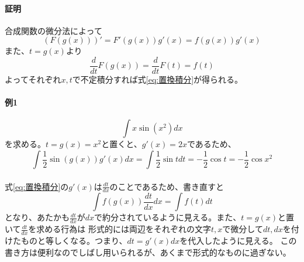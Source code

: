 \documentclass[a4j,dvipdfmx]{jsarticle}
\begin{document}
                \paragraph{証明} 合成関数の微分法によって
                \begin{equation}
                    (F(g(x)))'=F'(g(x))g'(x)=f(g(x))g'(x) 
                \end{equation}
                また、$t=g(x)$より
                \begin{equation}
                    \frac{d}{dt}F(g(x))=\frac{d}{dt}F(t)=f(t)
                \end{equation}
                よってそれぞれ$x,t$で不定積分すれば式\ref{eq:置換積分}が得られる。\\

                \paragraph{例1}
                \begin{equation*}
                    \int x\sin(x^2)dx
                \end{equation*}
                を求める。$t=g(x)=x^2$と置くと、$g'(x)=2x$であるため、
                \begin{equation*}
                    \int \frac{1}{2}\sin(g(x))g'(x)dx=\int \frac{1}{2}\sin t dt = -\frac{1}{2}\cos t = -\frac{1}{2}\cos x^2
                \end{equation*}\\

                式\ref{eq:置換積分}の$g'(x)$は$\frac{dt}{dx}$のことであるため、書き直すと
                \begin{equation}
                    \int f(g(x))\frac{dt}{dx}dx =\int f(t)dt 
                \end{equation}
                となり、あたかも$\frac{dt}{dx}$が$dx$で約分されているように見える。また、$t=g(x)$と置いて$\frac{dt}{dx}$を求める行為は
                形式的には両辺をそれぞれの文字$t,x$で微分して$dt,dx$を付けたものと等しくなる。つまり、$dt=g'(x)dx$を代入したように見える。
                この書き方は便利なのでしばし用いられるが、あくまで形式的なものに過ぎない。
                \clearpage
\end{document}
